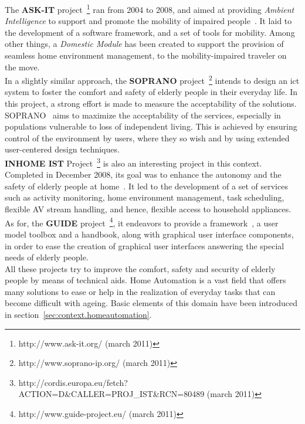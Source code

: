 The {\bf ASK-IT} project~\footnote{http://www.ask-it.org/ (march 2011)} ran from 2004 to 2008, and aimed at providing {\it Ambient Intelligence} to support and promote the mobility of impaired people~\cite{Wiethoff:2007}. It laid to the development of a software framework, and a set of tools for mobility. Among other things, a {\it Domestic Module} has been created to support the provision of seamless home environment management, to the mobility-impaired traveler on the move.\\

In a slightly similar approach, the {\bf SOPRANO} project~\footnote{http://www.soprano-ip.org/ (march 2011)} intends to design an \gls{ict} system to foster the comfort and safety of elderly people in their everyday life. In this project, a strong effort is made to measure the acceptability of the solutions.
SOPRANO~\cite{Sixsmith:2010} aims to maximize the acceptability of the services, especially in populations vulnerable to loss of independent living. This is achieved by ensuring control of the environment by users, where they so wish and by using extended user-centered design techniques.\\

{\bf INHOME IST} Project~\footnote{http://cordis.europa.eu/fetch?ACTION=D\&CALLER=PROJ\_IST\&RCN=80489 (march 2011)} is also an interesting project in this context. Completed in December 2008, its goal was to enhance the autonomy and the safety of elderly people at home~\cite{Vergados:2008}. It led to the development of a set of services such as activity monitoring, home environment management, task scheduling, flexible AV stream handling, and hence, flexible access to  household appliances.\\

As for, the {\bf GUIDE} project~\footnote{http://www.guide-project.eu/ (march 2011)}, it endeavors to provide a framework~\cite{Ciccarese:2005}, a user model toolbox and a handbook, along with graphical user interface components, in order to ease the creation of graphical user interfaces answering the special needs of elderly people.\\

All these projects try to improve the comfort, safety and security of elderly people by means of technical aids.
Home Automation is a vast field that offers many solutions to ease or help in the realization of everyday tasks that can become difficult with ageing. Basic elements of this domain have been introduced in section~\ref{sec:context.homeautomation}.

